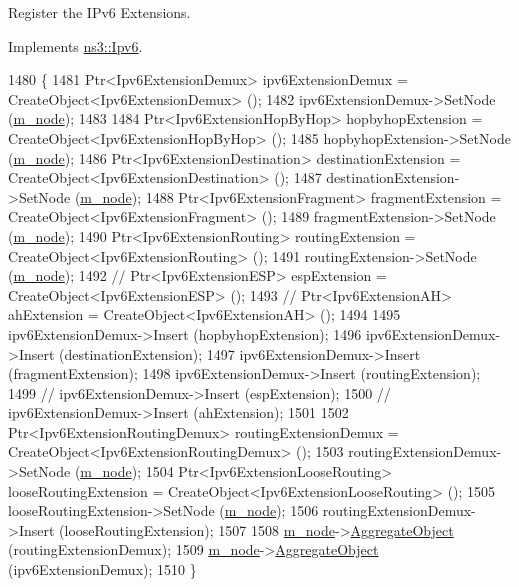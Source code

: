 Register the I\+Pv6 Extensions. 



Implements \hyperlink{classns3_1_1Ipv6_a57bd0dd1c4b1b9bb63b748124a548fe5}{ns3\+::\+Ipv6}.


\begin{DoxyCode}
1480 \{
1481   Ptr<Ipv6ExtensionDemux> ipv6ExtensionDemux = CreateObject<Ipv6ExtensionDemux> ();
1482   ipv6ExtensionDemux->SetNode (\hyperlink{classns3_1_1Ipv6L3Protocol_a543d8509395ee76de15d039ff1fce642}{m\_node});
1483 
1484   Ptr<Ipv6ExtensionHopByHop> hopbyhopExtension = CreateObject<Ipv6ExtensionHopByHop> ();
1485   hopbyhopExtension->SetNode (\hyperlink{classns3_1_1Ipv6L3Protocol_a543d8509395ee76de15d039ff1fce642}{m\_node});
1486   Ptr<Ipv6ExtensionDestination> destinationExtension = CreateObject<Ipv6ExtensionDestination> ();
1487   destinationExtension->SetNode (\hyperlink{classns3_1_1Ipv6L3Protocol_a543d8509395ee76de15d039ff1fce642}{m\_node});
1488   Ptr<Ipv6ExtensionFragment> fragmentExtension = CreateObject<Ipv6ExtensionFragment> ();
1489   fragmentExtension->SetNode (\hyperlink{classns3_1_1Ipv6L3Protocol_a543d8509395ee76de15d039ff1fce642}{m\_node});
1490   Ptr<Ipv6ExtensionRouting> routingExtension = CreateObject<Ipv6ExtensionRouting> ();
1491   routingExtension->SetNode (\hyperlink{classns3_1_1Ipv6L3Protocol_a543d8509395ee76de15d039ff1fce642}{m\_node});
1492   \textcolor{comment}{// Ptr<Ipv6ExtensionESP> espExtension = CreateObject<Ipv6ExtensionESP> ();}
1493   \textcolor{comment}{// Ptr<Ipv6ExtensionAH> ahExtension = CreateObject<Ipv6ExtensionAH> ();}
1494 
1495   ipv6ExtensionDemux->Insert (hopbyhopExtension);
1496   ipv6ExtensionDemux->Insert (destinationExtension);
1497   ipv6ExtensionDemux->Insert (fragmentExtension);
1498   ipv6ExtensionDemux->Insert (routingExtension);
1499   \textcolor{comment}{// ipv6ExtensionDemux->Insert (espExtension);}
1500   \textcolor{comment}{// ipv6ExtensionDemux->Insert (ahExtension);}
1501 
1502   Ptr<Ipv6ExtensionRoutingDemux> routingExtensionDemux = CreateObject<Ipv6ExtensionRoutingDemux> ();
1503   routingExtensionDemux->SetNode (\hyperlink{classns3_1_1Ipv6L3Protocol_a543d8509395ee76de15d039ff1fce642}{m\_node});
1504   Ptr<Ipv6ExtensionLooseRouting> looseRoutingExtension = CreateObject<Ipv6ExtensionLooseRouting> ();
1505   looseRoutingExtension->SetNode (\hyperlink{classns3_1_1Ipv6L3Protocol_a543d8509395ee76de15d039ff1fce642}{m\_node});
1506   routingExtensionDemux->Insert (looseRoutingExtension);
1507 
1508   \hyperlink{classns3_1_1Ipv6L3Protocol_a543d8509395ee76de15d039ff1fce642}{m\_node}->\hyperlink{classns3_1_1Object_a79dd435d300f3deca814553f561a2922}{AggregateObject} (routingExtensionDemux);
1509   \hyperlink{classns3_1_1Ipv6L3Protocol_a543d8509395ee76de15d039ff1fce642}{m\_node}->\hyperlink{classns3_1_1Object_a79dd435d300f3deca814553f561a2922}{AggregateObject} (ipv6ExtensionDemux);
1510 \}
\end{DoxyCode}


